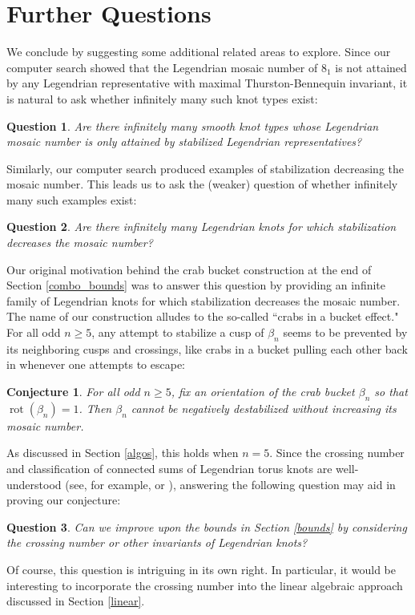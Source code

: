 \documentclass{article}
\DeclareMathOperator{\rot}{rot}
\newtheorem{conjecture}{Conjecture}
\newtheorem{question}{Question}
\begin{document}
\section{Further Questions}\label{questions}
We conclude by suggesting some additional related areas to explore.
Since our computer search showed that the Legendrian mosaic number of $8_1$ is not attained by any Legendrian representative with maximal Thurston-Bennequin invariant, it is natural to ask whether infinitely many such knot types exist:
\begin{question}
    Are there infinitely many smooth knot types whose Legendrian mosaic number is only attained by stabilized Legendrian representatives?
\end{question}
Similarly, our computer search produced examples of stabilization decreasing the mosaic number. This leads us to ask the (weaker) question of whether infinitely many such examples exist:
\begin{question}
    Are there infinitely many Legendrian knots for which stabilization decreases the mosaic number?
\end{question}
Our original motivation behind the crab bucket construction at the end of Section \ref{combo_bounds} was to answer this question by providing an infinite family of Legendrian knots for which stabilization decreases the mosaic number.
The name of our construction alludes to the so-called ``crabs in a bucket effect." For all odd $n\geq 5$, any attempt to stabilize a cusp of $\beta_n$ seems to be prevented by its neighboring cusps and crossings, like crabs in a bucket pulling each other back in whenever one attempts to escape:
\begin{conjecture}
    For all odd $n\geq 5$, fix an orientation of the crab bucket $\beta_{n}$ so that $\rot(\beta_n)=1$. Then $\beta_n$ cannot be negatively destabilized without increasing its mosaic number.
\end{conjecture}
As discussed in Section \ref{algos}, this holds when $n=5$.
Since the crossing number and classification of connected sums of Legendrian torus knots are well-understood (see, for example, \cite{torus-additivity} or \cite{connect-sum}), answering the following question may aid in proving our conjecture:

\begin{question}
    Can we improve upon the bounds in Section \ref{bounds} by considering the crossing number or other invariants of Legendrian knots?
\end{question}
Of course, this question is intriguing in its own right.
In particular, it would be interesting to incorporate the crossing number into the linear algebraic approach discussed in Section \ref{linear}.
\end{document}
